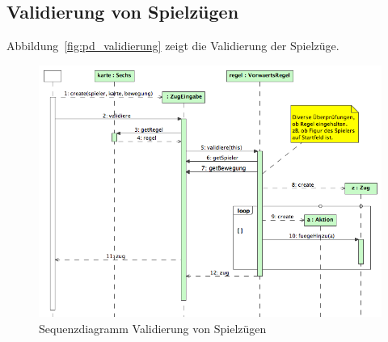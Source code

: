 \documentclass[12pt,halfparskip]{scrartcl}
\begin{document}
\clearpage
\subsection{Validierung von Spielzügen} %
\label{ssub:validierung_von_spielzügen}
Abbildung~\vref{fig:pd_validierung} zeigt die Validierung der Spielzüge.
\begin{figure}[h]
	\centering
	\includegraphics[width=\textwidth]{pd_validierung}
	\caption{Sequenzdiagramm Validierung von Spielzügen}
	\label{fig:pd_validierung}
\end{figure}

\clearpage
\end{document}

